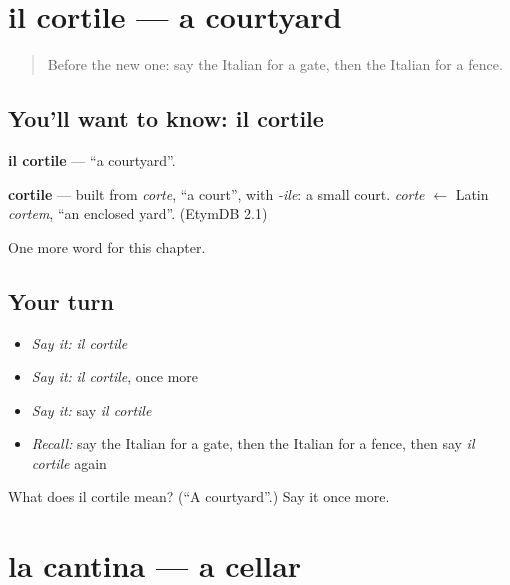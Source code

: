\section[il cortile]{il cortile — a courtyard}

\label{lesson:IT-C255-cortile}



\begin{quote}
Before the new one: say the Italian for a gate, then the Italian for a fence.
\end{quote}

\subsection*{You'll want to know: il cortile}
\textbf{il cortile} — \textquotedblleft{}a courtyard\textquotedblright{}.

\begin{cousinweb}
\textbf{cortile} — built from \emph{corte}, \textquotedblleft{}a court\textquotedblright{}, with \emph{-ile}: a small court. \emph{corte} $\leftarrow$ Latin \emph{cortem}, \textquotedblleft{}an enclosed yard\textquotedblright{}. (EtymDB 2.1)
\end{cousinweb}

\begin{grammarlens}[title={What you've built}]
One more word for this chapter.
\end{grammarlens}

\subsection*{Your turn}
\begin{itemize}
\raggedright
  \item \emph{Say it:} \emph{il cortile}
  \item \emph{Say it:} \emph{il cortile}, once more
  \item \emph{Say it:} say \emph{il cortile}
  \item \emph{Recall:} say the Italian for a gate, then the Italian for a fence, then say \emph{il cortile} again
\end{itemize}

\begin{tcolorbox}[breakable,colback=teal!4,colframe=teal!35!black,title={Before you move on}]
What does il cortile mean? (\textquotedblleft{}A courtyard\textquotedblright{}.) Say it once more.
\end{tcolorbox}
\section[la cantina]{la cantina — a cellar}

